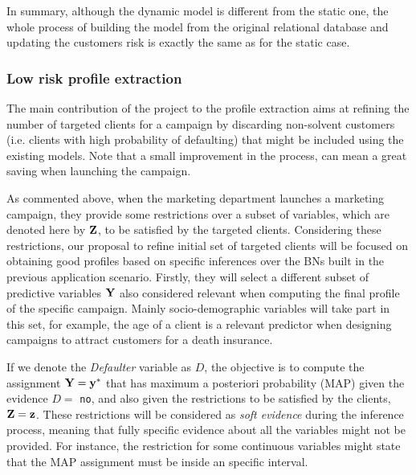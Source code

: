In summary, although the dynamic model is different from the static one, the whole process of building the model from the original relational database and updating the customers risk is exactly the same as for the static case.

\subsubsection{Low risk profile extraction} \label{subsubsec:profileExtraction}

The main contribution of the project to the profile extraction aims at refining the number of targeted clients for a campaign by discarding non-solvent customers (i.e. clients with high probability of defaulting) that might be included using the existing models. Note that a small improvement in the process, can mean a great saving when launching the campaign. 

As commented above, when the marketing department launches a marketing campaign, they provide some restrictions over a subset of variables, which are denoted here by $\Z$, to be satisfied by the targeted clients.  Considering these restrictions, our proposal to refine initial set of targeted clients will be focused on obtaining good profiles based on specific inferences over the BNs built in the previous application scenario. Firstly, they will select a different subset of predictive variables $\Y$ also considered relevant when computing the final profile of the specific campaign. Mainly  socio-demographic variables will take part in this set, for example, the age of a client is a relevant predictor when designing campaigns to attract customers for a death insurance. 

If we denote the \emph{Defaulter} variable as $D$,  the objective is to compute the assignment $\Y = \y^{*}$ that has maximum a posteriori probability (MAP) given the evidence $D=$ \texttt{no}, and also given the restrictions to be satisfied by the clients, $\Z=\z$. These restrictions will be considered as \textit{soft evidence} during the inference process, meaning that fully specific evidence about all the variables might not be provided. For instance, the restriction for some continuous variables might state that the MAP assignment must be inside an specific interval.

